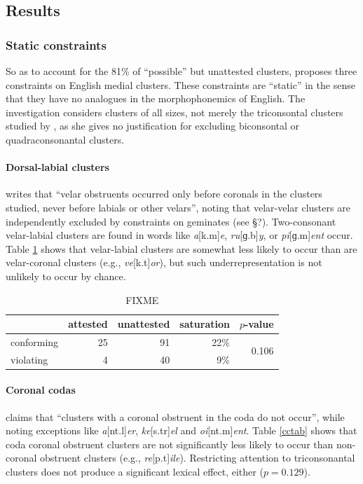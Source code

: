 \subsection{Results}

\subsubsection{Static constraints}

So as to account for the 81\% of ``possible'' but unattested clusters, \citet{Pierrehumbert1994} proposes three constraints on English medial clusters. These constraints are ``static'' in the sense that they have no analogues in the morphophonemics of English. The investigation considers clusters of all sizes, not merely the triconsontal clusters studied by \citeauthor{Pierrehumbert1994}, as she gives no justification for excluding biconsontal or quadraconsonantal clusters.

\paragraph{Dorsal-labial clusters} \citet[173]{Pierrehumbert1994} writes that ``velar obstruents occurred only before coronals in the clusters studied, never before labials or other velars'', noting that velar-velar clusters are independently excluded by constraints on geminates (see \S?). Two-consonant velar-labial clusters are found in words like \emph{a}[k.m]\emph{e}, \emph{ru}[ɡ.b]\emph{y}, or \emph{pi}[ɡ.m]\emph{ent} occur. Table \ref{dltab} shows that velar-labial clusters are somewhat less likely to occur than  are velar-coronal clusters (e.g., \emph{ve}[k.t]\emph{or}), but such underrepresentation is not unlikely to occur by chance.

\begin{table}
\centering
\begin{tabular}{l rrrr}
\toprule
           & attested & unattested & saturation & $p$-value \\
\midrule
conforming & 25       & 91         & 22\%       & \multirow{2}{*}{0.106} \\
violating  &  4       & 40         &  9\%       \\
\bottomrule
\end{tabular}
\caption{FIXME}
\label{dltab}
\end{table}

\paragraph{Coronal codas} \citet[175]{Pierrehumbert1994} claims that ``clusters with a coronal obstruent in the coda do not occur'', while noting exceptions like \emph{a}[nt.l]\emph{er}, \emph{ke}[s.tr]\emph{el} and \emph{oi}[nt.m]\emph{ent}. Table \ref{cctab} shows that coda coronal obstruent clusters are not significantly less likely to occur than non-coronal obstruent clusters (e.g., \emph{re}[p.t]\emph{ile}). Restricting attention to triconsonantal clusters does not produce a significant lexical effect, either ($p = 0.129$).

